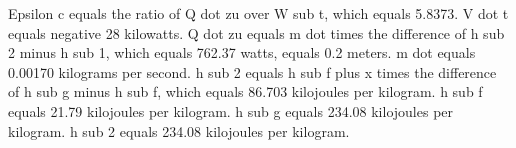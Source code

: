 Epsilon c equals the ratio of Q dot zu over W sub t, which equals 5.8373.
V dot t equals negative 28 kilowatts.
Q dot zu equals m dot times the difference of h sub 2 minus h sub 1, which equals 762.37 watts, equals 0.2 meters.
m dot equals 0.00170 kilograms per second.
h sub 2 equals h sub f plus x times the difference of h sub g minus h sub f, which equals 86.703 kilojoules per kilogram.
h sub f equals 21.79 kilojoules per kilogram.
h sub g equals 234.08 kilojoules per kilogram.
h sub 2 equals 234.08 kilojoules per kilogram.